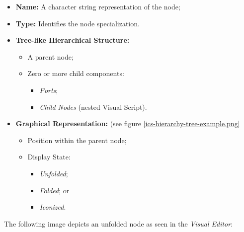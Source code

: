 \begin{itemize}
\item \textbf{Name:} A character string representation of the node;

\item \textbf{Type:} Identifies the node specialization.

\item \textbf{Tree-like Hierarchical Structure:}

\begin{itemize}
\item A parent node;

\item Zero or more child components:

\begin{itemize}
\item \emph{Ports};

\item \emph{Child Nodes} (nested Visual Script).

\end{itemize}

\end{itemize}

\item \textbf{Graphical Representation:} (see figure \ref{ics-hierarchy-tree-example.png}

\begin{itemize}
\item Position within the parent node;

\item Display State:

\begin{itemize}
\item \emph{Unfolded};

\item \emph{Folded}; or

\item \emph{Iconized}.

\end{itemize}

\end{itemize}

\end{itemize}

The following image depicts an unfolded node as seen in the \emph{Visual Editor}:

